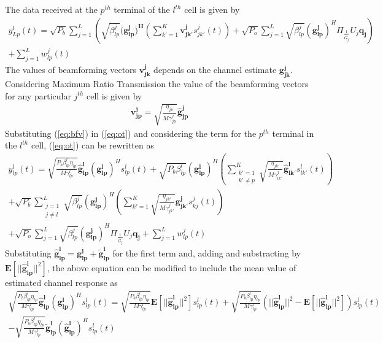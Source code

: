 \documentclass[10pt, a4paper, twoside,fleqn]{article}
\begin{document}
The data received at the $p^{th}$ terminal of the $l^{th}$ cell is given by
\begin{eqnarray}\label{eq:ot}
 	y_{Lp}^{l}(t) = \sqrt{P_b}\sum_{j=1}^{L} \left(\sqrt{\beta_{lp}^{j}} (\mathbf{g_{lp}^{j})^H} \left(\sum_{k'=1}^{K}\mathbf{v_{jk'}^{j}}s_{jk'}^{j}(t)\right)
 		      + \sqrt{P_o}\sum_{j=1}^{L}\sqrt{\beta_{lp}^{j}}(\mathbf{g_{lp}^{j}})^H \Pi_{\frac{1}{\hat G_j}} U_j \mathbf{q_{j}}\right) \nonumber \\
 		      + \sum_{j=1}^{L} w_{lp}^{j}(t)
\end{eqnarray}  
The values of beamforming vectors $\mathbf{v_{jk}^{j}}$ depends on the channel estimate $\mathbf{g_{jk}^{j}}$. Considering Maximum Ratio Transmission the value of the beamforming vectors for any particular $j^{th}$ cell is given by
\begin{eqnarray}\label{eq:bfv}
	\mathbf{v_{jp}^{j}} = \sqrt{\frac{\eta_{jp}}{M\gamma_{jp}^{j}}}\mathbf{\hat g_{jp}^{j}}
\end{eqnarray}
Substituting (\ref{eq:bfv}) in (\ref{eq:ot}) and considering the term for the $p^{th}$ terminal in the $l^{th}$ cell, (\ref{eq:ot}) can be rewritten as
\begin{eqnarray}\label{eqn:completeot}
    y_{lp}^{l}(t) = \sqrt{\frac{P_b\beta_{lp}^{l}\eta_{lp}}{M\gamma_{lp}^{l}}}\mathbf{\hat g_{lp}^{l}} (\mathbf{g_{lp}^{l}})^H  s_{lp}^{l}(t)
                  + \sqrt{P_b\beta_{lp}^{l}} (\mathbf{g_{lp}^{l}})^H \left(\sum_{\substack{k'=1 \\ k' \neq p}}^{K} \sqrt{\frac{\eta_{jk'}}{M\gamma_{lk'}^{j}}}\mathbf{\hat g_{lk'}^{l}}s_{lk'}^{l} (t)\right) \nonumber \\
		  + \sqrt{P_b} \sum_{\substack{j=1 \\ j \neq l}}^{L}\sqrt{\beta_{lp}^{j}} (\mathbf{g_{lp}^{j}})^H \left(\sum_{k'=1}^{K} \sqrt{\frac{\eta_{jk'}}{M\gamma_{jk'}^{j}}}\mathbf{g_{jk'}^{j}}s_{kj}^{j} (t)\right) \nonumber \\
		  + \sqrt{P_o}\sum_{j=1}^{L}\sqrt{\beta_{lp}^{j}}(\mathbf{g_{lp}^{j}})^H \Pi_{\frac{1}{\hat G_j}} U_j \mathbf{q_{j}} 
    	  	  + \sum_{j=1}^{L} w_{lp}^{j}(t)
\end{eqnarray}
Substituting $\mathbf{\hat g_{lp}^{l}} = \mathbf{g_{lp}^{l}} + {\mathbf{\widetilde{g}_{lp}^{l}}}$ for the first term and, adding and substracting by $\mathbf{E}[||\mathbf{\hat g_{lp}^{l}}||^2]$, the above equation can be modified to include the mean value of estimated channel response as
\begin{eqnarray} \label{eqn:otsig}
	\sqrt{\frac{P_b\beta_{lp}^{l}\eta_{lp}}{M\gamma_{lp}^{l}}}\mathbf{\hat g_{lp}^{l}} (\mathbf{g_{lp}^{l}})^H  s_{lp}^{l}(t)
	           =  \sqrt{\frac{P_b\beta_{lp}^{l}\eta_{lp}}{M\gamma_{lp}^{l}}}\mathbf{E}[||\mathbf{\hat g_{lp}^{l}}||^2]s_{lp}^{l}(t)
	           +  \sqrt{\frac{P_b\beta_{lp}^{l}\eta_{lp}}{M\gamma_{lp}^{l}}}\left(||\mathbf{\hat g_{lp}^{l}}||^2 - \mathbf{E}[||\mathbf{\hat g_{lp}^{l}}||^2]\right)s_{lp}^{l}(t) \nonumber \\
	           -   \sqrt{\frac{P_b\beta_{lp}^{l}\eta_{lp}}{M\gamma_{lp}^{l}}}\mathbf{\widetilde{g}_{lp}^{l}} (\mathbf{\hat g_{lp}^{l}})^H  s_{lp}^{l}(t)
\end{eqnarray}
\end{document}

